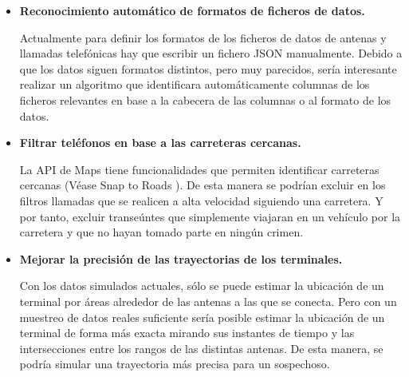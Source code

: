     \begin{itemize}
      \item \textbf{Reconocimiento automático de formatos de ficheros de datos.}
      
      Actualmente para definir los formatos de los ficheros de datos de antenas y llamadas telefónicas hay que escribir un fichero JSON manualmente. 
      Debido a que los datos siguen formatos distintos, pero muy parecidos, sería interesante realizar un algoritmo que identificara automáticamente columnas de los ficheros relevantes en base a la cabecera de las columnas o al formato de los datos.
      
      \item \textbf{Filtrar teléfonos en base a las carreteras cercanas.}
      
      La API de Maps tiene funcionalidades que permiten identificar carreteras cercanas (Véase Snap to Roads \cite{snaproad}). De esta manera se podrían excluir en los filtros llamadas que se realicen a alta velocidad siguiendo una carretera. Y por tanto, excluir transeúntes que simplemente viajaran en un vehículo por la carretera y que no hayan tomado parte en ningún crimen.
      
      \item \textbf{Mejorar la precisión de las trayectorias de los terminales.}
      
      Con los datos simulados actuales, sólo se puede estimar la ubicación de un terminal por áreas alrededor de las antenas a las que se conecta.
      Pero con un muestreo de datos reales suficiente sería posible estimar la ubicación de un terminal de forma más exacta mirando sus instantes de tiempo y las intersecciones entre los rangos de las distintas antenas. De esta manera, se podría simular una trayectoria más precisa para un sospechoso.
    \end{itemize}